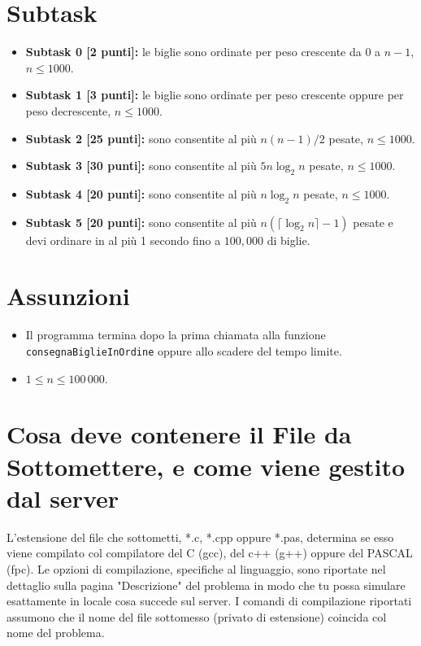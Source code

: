 \documentclass[a4paper,11pt]{article}
\begin{document}
  
  \section*{Subtask}
  \begin{itemize}
    \item \textbf{Subtask 0 [2 punti]:} le biglie sono ordinate per peso crescente da $0$ a $n-1$, $n \leq 1000$.
    \item \textbf{Subtask 1 [3 punti]:} le biglie sono ordinate per peso crescente oppure per peso decrescente, $n \leq 1000$.
    \item \textbf{Subtask 2 [25 punti]:} sono consentite al pi\`u $n(n-1)/2$ pesate, $n \leq 1000$.
    \item \textbf{Subtask 3 [30 punti]:} sono consentite al pi\`u $5n\log_2 n$ pesate, $n \leq 1000$.
    \item \textbf{Subtask 4 [20 punti]:} sono consentite al pi\`u $n\log_2 n$ pesate, $n \leq 1000$.
    \item \textbf{Subtask 5 [20 punti]:} sono consentite al pi\`u $n(\lceil \log_2 n \rceil -1)$ pesate e devi ordinare in al pi\`u 1 secondo fino a $100,000$ di biglie.
  \end{itemize}
  
  \section*{Assunzioni}
  \begin{itemize}[nolistsep, noitemsep]
    \item Il programma termina dopo la prima chiamata alla funzione \texttt{consegnaBiglieInOrdine} oppure allo scadere del tempo limite.
    \item $1 \le n \le 100\,000$.
  \end{itemize}


  \section*{Cosa deve contenere il File da Sottomettere, e come viene gestito dal server}

  L'estensione del file che sottometti, *.c, *.cpp oppure *.pas,
  determina se esso viene compilato col compilatore del C (gcc),
  del c++ (g++) oppure del PASCAL (fpc).
  Le opzioni di compilazione, specifiche al linguaggio,
  sono riportate nel dettaglio sulla pagina "Descrizione" del problema
  in modo che tu possa simulare esattamente in locale cosa succede sul server.
  I comandi di compilazione riportati assumono che il nome del file sottomesso (privato di estensione) coincida col nome del problema.
\end{document}
